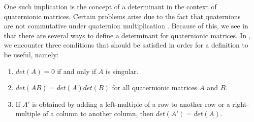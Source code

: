 One such implication is the concept of a determinant in the context of quaternionic matrices. Certain problems arise due to the fact that quaternions are not commutative under quaternion multiplication \cite{aslaksen}. Because of this, we see in \cite{aslaksen} that there are several ways to define a determinant for quaternionic matrices. In \cite{aslaksen}, we encounter three conditions that should be satisfied in order for a definition to be useful, namely:
\begin{enumerate}
	\item $det(A) = 0$ if and only if $A$ is singular.
	\item $det(AB) = det(A)det(B)$ for all quaternionic matrices $A$ and $B$.
	\item If $A'$ is obtained by adding a left-multiple of a row to another row or a right-multiple of a column to another column, then $det(A')=det(A)$.
\end{enumerate}

